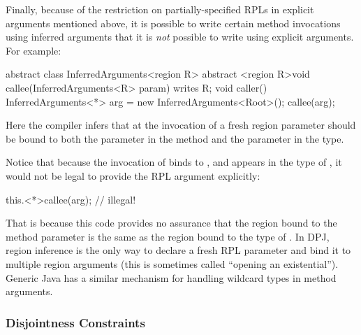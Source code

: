 Finally, because of the restriction on partially-specified RPLs in
explicit arguments mentioned above, it is possible to write certain
method invocations using inferred arguments that it is \emph{not}
possible to write using explicit arguments.  For example:
%
\begin{dpjlisting}
abstract class InferredArguments<region R> {
  abstract <region R>void callee(InferredArguments<R> param) writes R;
  void caller() {
    InferredArguments<*> arg = new InferredArguments<Root>();
    callee(arg);
  }
}
\end{dpjlisting}
%
Here the compiler infers that at the invocation of  a
fresh region parameter should be bound to both the parameter 
in the method and the parameter  in the type.

Notice that because the invocation of  binds \kwd{*} to
, and  appears in the type of , it would not
be legal to provide the RPL argument explicitly:
%
\begin{dpjlisting}
this.<*>callee(arg); // illegal!
\end{dpjlisting}
%
That is because this code provides no assurance that the region bound
to the method parameter is the same as the region bound to the type of
.  In DPJ, region inference is the only way to declare a
fresh RPL parameter and bind it to multiple region arguments (this is
sometimes called ``opening an existential'').  Generic Java has a
similar mechanism for handling wildcard types in method arguments.

\subsubsection{Disjointness Constraints%
\label{sec:classes:params:disjoint}}

